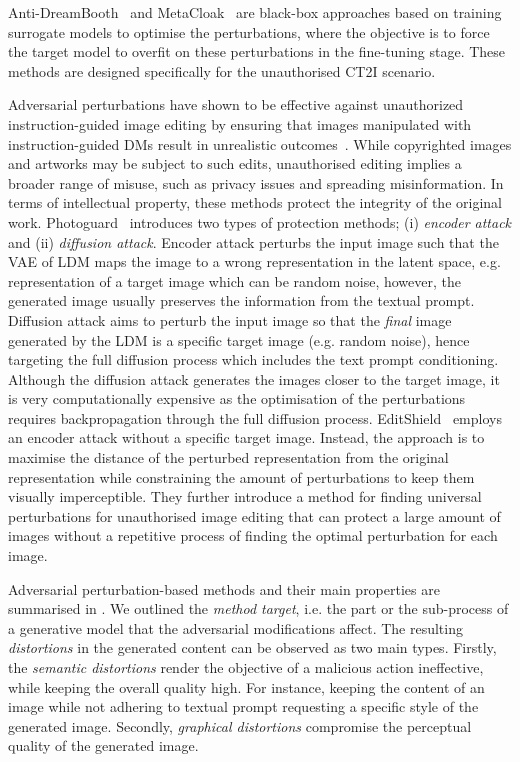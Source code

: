 \documentclass[conference]{IEEEtran}
\begin{document}
Anti-DreamBooth~\cite{van_le_anti-dreambooth_2023} and MetaCloak~\cite{liu_toward_2023} are black-box approaches based on training surrogate models to optimise the perturbations, where the objective is to force the target model to overfit on these perturbations in the fine-tuning stage. These methods are designed specifically for the unauthorised CT2I scenario.

Adversarial perturbations have shown to be effective against unauthorized instruction-guided image editing
by ensuring that images manipulated with instruction-guided DMs result in unrealistic outcomes~\cite{chen_editshield_2023,salman_raising_2023}. 
While copyrighted images and artworks may be subject to such edits, unauthorised editing implies a broader range of misuse, such as privacy issues and spreading misinformation. %
In terms of intellectual property, these methods protect the integrity of the original work. 
Photoguard~\cite{salman_raising_2023} introduces two types of protection methods; (i) \textit{encoder attack} and (ii) \textit{diffusion attack}.
Encoder attack perturbs the input image such that the VAE of LDM maps the image to a wrong representation in the latent space, e.g. representation of a target image which can be random noise, however, the generated image usually preserves the information from the textual prompt.
Diffusion attack aims to perturb the input image so that the \textit{final} image generated by the LDM is a specific target image (e.g. random noise), hence targeting the full diffusion process which includes the text prompt conditioning.
Although the diffusion attack generates the images closer to the target image, it is very computationally expensive as the optimisation of the perturbations requires backpropagation through the full diffusion process.
EditShield~\cite{chen_editshield_2023} employs an encoder attack without a specific target image. Instead, the approach is to maximise the distance of the perturbed representation from the original representation while constraining the amount of perturbations to keep them visually imperceptible. 
They further introduce a method for finding universal perturbations for unauthorised image editing that can protect a large amount of images without a repetitive process of finding the optimal perturbation for each image.  	

Adversarial perturbation-based methods and their main properties are summarised in . 
We outlined the \textit{method target}, i.e. the part or the sub-process of a generative model that the adversarial modifications affect.
The resulting \textit{distortions} in the generated content can be observed as two main types. Firstly, the \textit{semantic distortions} render the objective of a malicious action ineffective, while keeping the overall quality high. 
For instance, keeping the content of an image while not adhering to textual prompt requesting a specific style of the generated image. 
Secondly, \textit{graphical distortions} compromise the perceptual quality of the generated image.
\end{document}
